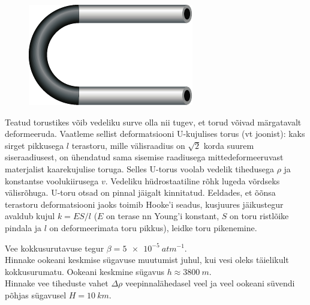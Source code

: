 \documentclass[10pt, twoside]{article}
\begin{document}
{
\begin{figure}
	\begin{center}
		\vspace{-15pt}
		\includegraphics[width=\linewidth]{2009-lahg-06-yl}
	\end{center}
\end{figure}
Teatud torustikes võib vedeliku surve olla nii tugev, et torud võivad märgatavalt deformeeruda. Vaatleme sellist deformatsiooni U-kujulises torus (vt joonist): kaks sirget pikkusega $l$ terastoru, mille välisraadius on $\sqrt 2$ korda suurem siseraadiusest, on ühendatud sama sisemise raadiusega mittedeformeeruvast materjalist kaarekujulise toruga. Selles U-torus voolab vedelik tihedusega $\rho$ ja konstantse voolukiirusega $v$. Vedeliku hüdrostaatiline rõhk lugeda võrdseks välisrõhuga. U-toru otsad on pinnal jäigalt kinnitatud. Eeldades, et õõnsa terastoru deformatsiooni jaoks toimib Hooke’i seadus, kusjuures jäikustegur avaldub kujul $k = ES/l$ ($E$ on terase nn Young’i konstant, $S$ on toru ristlõike pindala ja $l$ on deformeerimata toru pikkus), leidke toru pikenemine.
\probend
\bigskip


Vee kokkusurutavuse tegur $\beta = \SI{5e-5}{atm^{-1}}$.\\
\osa Hinnake ookeani keskmise sügavuse muutumist juhul, kui vesi oleks täielikult kokkusurumatu. Ookeani keskmine sügavus $h \approx \SI{3800}{m}$.\\
\osa Hinnake vee tiheduste vahet $\Delta \rho$ veepinnalähedasel veel ja veel ookeani süvendi põhjas sügavusel $H = \SI{10}{km}$. 

}
\end{document}
